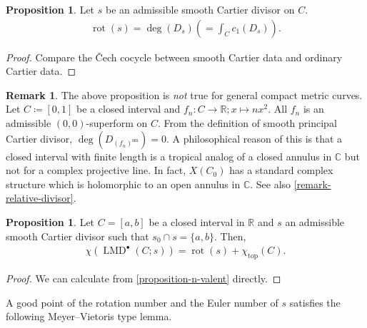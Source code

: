 \documentclass[a4paper,dvipdfmx,reqno,12pt]{amsart}
\theoremstyle{definition}
\newtheorem{proposition}[theorem]{Proposition}
\newtheorem{remark}[theorem]{Remark}
\newcommand{\deq}{\coloneqq}
\newcommand{\opn}[1]{\operatorname{#1}}
\numberwithin{equation}{section}
\begin{document}
\begin{proposition}
Let $s$ be an admissible smooth Cartier divisor on $C$.
\label{equation-rotation-number}
\begin{align}
\opn{rot}(s)=\opn{deg}(D_s)(=\int_{C} c_1(D_s)).
\end{align}
\end{proposition}

\begin{proof}
Compare the \v{C}ech cocycle between smooth Cartier data and ordinary Cartier data.
\end{proof}

\begin{remark}
\label{remark-rotation-closed-interval} 
The above proposition 
is \emph{not} true for general compact metric curves.
Let $C\deq [0,1]$ be a closed interval
and $f_n\colon C\to \mathbb{R};x \mapsto nx^{2}$.
All $f_n$ is an admissible $(0,0)$-superform on $C$.
From the definition of smooth principal Cartier divisor,
$\opn{deg}(D_{(f_n)^{\mathrm{sm}}})=0$. 
A philosophical reason of this is that
a closed interval with finite length is a tropical
analog of a closed annulus in $\mathbb{C}$ but not for
a complex projective line. In fact, $X(C_0)$ 
has a standard complex structure which is holomorphic to
an open annulus in $\mathbb{C}$.
See also \cref{remark-relative-divisor}.
\end{remark}

\begin{proposition}
\label{proposition-simple-interval-rr}
Let $C=[a,b]$ be a closed interval in $\mathbb{R}$
and $s$ an admissible smooth Cartier divisor 
such that $s_0\cap s=\{a,b\}$. Then,
\begin{align}
\chi(\opn{LMD}^{\bullet}(C;s))=\opn{rot}(s)+
\chi_{\opn{top}}(C).
\end{align}
\end{proposition}
\begin{proof}
We can calculate from 
\cref{proposition-n-valent} directly.
\end{proof}

A good point of the rotation number and the 
Euler number of $s$ satisfies the 
following Meyer--Vietoris type lemma.
\end{document}
